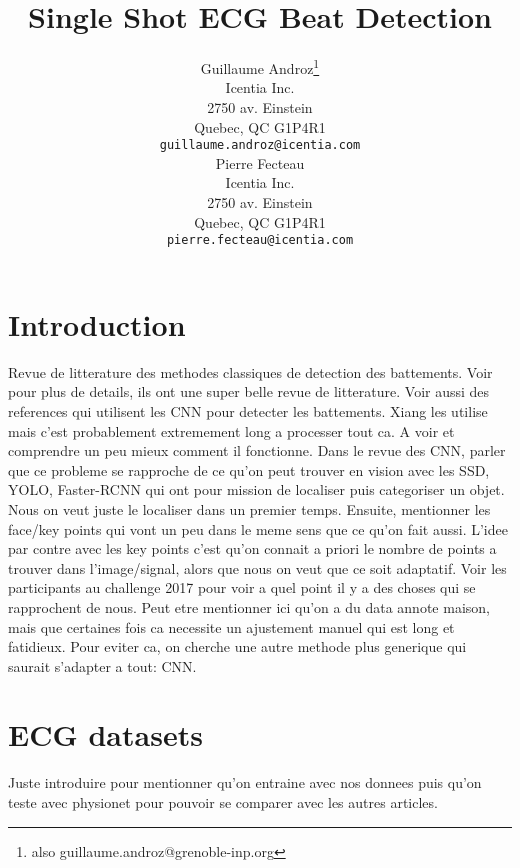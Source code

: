 \documentclass{article}
\title{Single Shot ECG Beat Detection}
\author{
  Guillaume Androz\thanks{also guillaume.androz@grenoble-inp.org} \\
  Icentia Inc.\\
  2750 av. Einstein\\
  Quebec, QC G1P4R1 \\
  \texttt{guillaume.androz@icentia.com} \\
   \And
  Pierre Fecteau\\
  Icentia Inc.\\
  2750 av. Einstein\\
  Quebec, QC G1P4R1 \\
  \texttt{pierre.fecteau@icentia.com} \\
}
\begin{document}
\maketitle

\begin{abstract}
\lipsum[1]
\end{abstract}




\section{Introduction}
Revue de litterature des methodes classiques de detection des battements. Voir \cite{Xiang2018} pour plus de details, ils ont une super belle revue de litterature.
Voir aussi des references qui utilisent les CNN pour detecter les battements. Xiang \cite{Xiang2018} les utilise mais c'est probablement extremement long a processer tout ca. A voir et comprendre un peu mieux comment il fonctionne.
Dans le revue des CNN, parler que ce probleme se rapproche de ce qu'on peut trouver en vision avec les SSD, YOLO, Faster-RCNN qui ont pour mission de localiser puis categoriser un objet. Nous on veut juste le localiser dans un premier temps. Ensuite, mentionner les face/key points qui vont un peu dans le meme sens que ce qu'on fait aussi. L'idee par contre avec les key points c'est qu'on connait a priori le nombre de points a trouver dans l'image/signal, alors que nous on veut que ce soit adaptatif.
Voir les participants au challenge 2017 pour voir a quel point il y a des choses qui se rapprochent de nous. 
Peut etre mentionner ici qu'on a du data annote maison, mais que certaines fois ca necessite un ajustement manuel qui est long et fatidieux. Pour eviter ca, on cherche une autre methode plus generique qui saurait s'adapter a tout: CNN.

\section{ECG datasets}
\label{sec:headings}

Juste introduire pour mentionner qu'on entraine avec nos donnees puis qu'on teste avec physionet pour pouvoir se comparer avec les autres articles.
\end{document}
